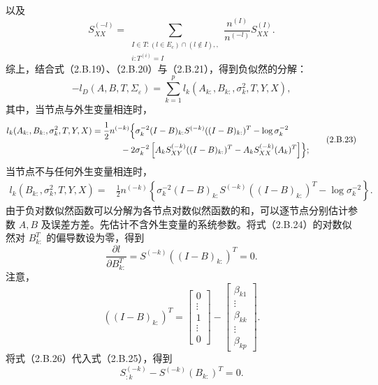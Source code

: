 以及
\[
S_{XX}^{(-l)}
 =\sum_{\substack{I\in T:(l\in E_c)\cap(l\notin I),,\\i:T^{(i)}=I}}
   \frac{n^{(I)}}{n^{(-l)}}S_{XX}^{(I)}.
\]
综上，结合式（2.B.19）、（2.B.20）与（2.B.21），得到负似然的分解：
\begin{equation}
-l_D(A,B,T,\Sigma_\varepsilon)
 =\sum_{k=1}^pl_k(A_{k:},B_{k:},\sigma_k^2,T,Y,X),\tag{2.B.22}
\end{equation}
其中，当节点与外生变量相连时，
\begin{equation}
\begin{aligned}
l_k(A_{k:},B_{k:},\sigma_k^2,T,Y,X)
 ={}&\frac12n^{(-k)}
 \Bigl\{\sigma_k^{-2}(I-B)_{k:}S^{(-k)}((I-B)_{k:})^T
 -\log\sigma_k^{-2}\\
 &\qquad-2\sigma_k^{-2}
 \left[A_kS_{XY}^{(-k)}((I-B)_{k:})^T
       -A_kS_{XX}^{(-k)}(A_k)^T\right]\Bigr\};
\end{aligned}\tag{2.B.23}
\end{equation}
当节点不与任何外生变量相连时，
\begin{equation}
\begin{aligned}
l_k(B_{k:},\sigma_k^2,T,Y,X)
 ={}&\frac12n^{(-k)}
 \left\{\sigma_k^{-2}(I-B)_{k:}S^{(-k)}((I-B)_{k:})^T
 -\log\sigma_k^{-2}\right\}.
\end{aligned}\tag{2.B.24}
\end{equation}
由于负对数似然函数可以分解为各节点对数似然函数的和，可以逐节点分别估计参数 $A,B$ 及误差方差。先估计不含外生变量的系统参数。将式（2.B.24）的对数似然对 $B_{k:}^T$ 的偏导数设为零，得到
\begin{equation}
\frac{\partial l}{\partial B_{k:}^T}
 =S^{(-k)}((I-B)_{k:})^T=0.\tag{2.B.25}
\end{equation}
注意，
\begin{equation}
((I-B)_{k:})^T
 =\begin{bmatrix}0\\\vdots\\1\\\vdots\\0\end{bmatrix}
  -\begin{bmatrix}\beta_{k1}\\\vdots\\\beta_{kk}\\\vdots\\\beta_{kp}\end{bmatrix}.
\tag{2.B.26}
\end{equation}
将式（2.B.26）代入式（2.B.25），得到
\[
S_{:k}^{(-k)}-S^{(-k)}(B_{k:})^T=0.
\]
